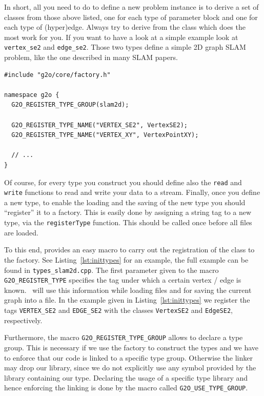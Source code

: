 \documentclass[a4paper]{article}
\begin{document}
In short, all you need to do to define a new problem instance is to
derive a set of classes from those above listed, one for each type of
parameter block and one for each type of (hyper)edge. Always try to
derive from the class which does the most work for you.  If you want to
have a look at a simple example look at \verb+vertex_se2+ and
\verb+edge_se2+. Those two types define a simple 2D graph SLAM
problem, like the one described in many SLAM papers.

\begin{lstlisting}[float,label=lst:inittypes,caption=Registering types
  by a constructor from a library]
#include "g2o/core/factory.h"

namespace g2o {
  G2O_REGISTER_TYPE_GROUP(slam2d);

  G2O_REGISTER_TYPE_NAME("VERTEX_SE2", VertexSE2);
  G2O_REGISTER_TYPE_NAME("VERTEX_XY", VertexPointXY);

  // ...
}
\end{lstlisting}

Of course, for every type you construct you should define also the
\verb+read+ and \verb+write+ functions to read and write your data to a
stream.  Finally, once you define a new type, to enable the loading and
the saving of the new type you should ``register'' it to a factory.
This is easily done by assigning a string tag to a new type, via the
\verb+registerType+ function. This should be called once before
all files are loaded.

To this end, \gopt{} provides an easy macro to carry out the registration of the
class to the factory.  See Listing~\ref{lst:inittypes} for an example,
the full example can be found in \verb+types_slam2d.cpp+.  The first
parameter given to the macro \verb+G2O_REGISTER_TYPE+ specifies the tag
under which a certain vertex / edge is known. \gopt\ will use this
information while loading files and for saving the current graph into a
file. In the example given in Listing~\ref{lst:inittypes} we register
the tags \verb+VERTEX_SE2+ and \verb+EDGE_SE2+ with the classes
\verb+VertexSE2+ and \verb+EdgeSE2+, respectively.

Furthermore, the macro \verb+G2O_REGISTER_TYPE_GROUP+ allows to declare
a type group. This is necessary if we use the factory to construct the
types and we have to enforce that our code is linked to a specific type
group. Otherwise the linker may drop our library, since we do not
explicitly use any symbol provided by the library containing our type.
Declaring the usage of a specific type library and hence enforcing the
linking is done by the macro called \verb+G2O_USE_TYPE_GROUP+.
\end{document}
